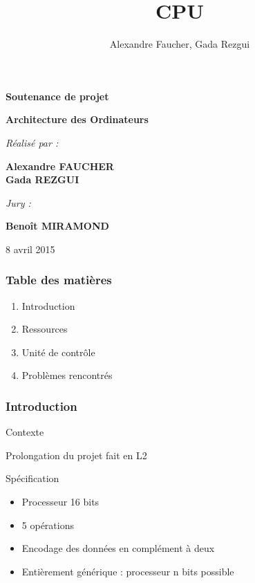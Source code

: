 \documentclass{beamer}
\title{CPU}
\author{Alexandre Faucher, Gada Rezgui}
\begin{document}

\begin{frame}
	\begin{center}

	{\Huge \textbf{Soutenance de projet}}

	\vspace*{0.3cm}

	{\large \textbf{Architecture des Ordinateurs}}

	\vspace*{0.5cm}

	\textit{Réalisé par :}

	{\large \textbf{Alexandre FAUCHER\\ Gada REZGUI}}

	\vspace*{0.5cm}

	\textit{Jury :}

	{\large \textbf{Benoît MIRAMOND}}

	\vspace*{0.5cm}

	{\large 8 avril 2015}

	\end{center}
\end{frame}



\begin{frame}
\frametitle{Table des matières}
\begin{enumerate}
	\item Introduction
	\item Ressources

	\item Unité de contrôle
	\item Problèmes rencontrés


\end{enumerate}
\end{frame}


\begin{frame}
\frametitle{Introduction}
\begin{block}{Contexte}

		 Prolongation du projet fait en L2

\end{block}
\begin{block}{Spécification}
	\begin{itemize}
		\item Processeur 16 bits
		\item 5 opérations
		\item Encodage des données en complément à deux
		\item Entièrement générique : processeur n bits possible
	\end{itemize}
\end{block}
\end{frame}
\end{document}
